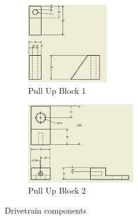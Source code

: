 \documentclass{article}
\begin{document}
\begin{figure}[h!]
\centering
\begin{subfigure}{.45\textwidth}
  \centering
  \includegraphics[height=3.5cm]{24_02-11/images/PullUpBlock1.PNG}
    \caption{Pull Up Block 1}
    \label{fig:PullUp1}
 \end{subfigure}
\begin{subfigure}{.45\textwidth}
  \centering
     \includegraphics[height=3.5cm]{24_02-11/images/PullUp2.PNG}
    \caption{Pull Up Block 2}
    \label{fig:PullUp2}
  \end{subfigure}
  \caption{Drivetrain components}
  \end{figure}
\end{document}
